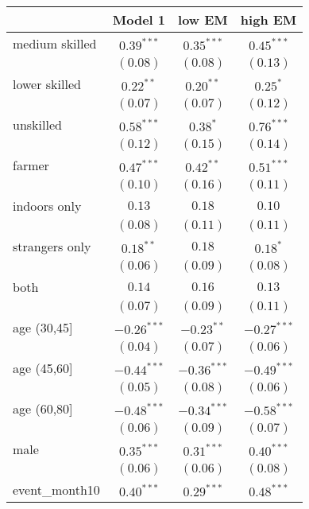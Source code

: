 
\begin{table}
\begin{center}
\begin{tabular}{l c c c}
\hline
 & Model 1 & low EM & high EM \\
\hline
medium skilled & $0.39^{***}$  & $0.35^{***}$  & $0.45^{***}$  \\
               & $(0.08)$      & $(0.08)$      & $(0.13)$      \\
lower skilled  & $0.22^{**}$   & $0.20^{**}$   & $0.25^{*}$    \\
               & $(0.07)$      & $(0.07)$      & $(0.12)$      \\
unskilled      & $0.58^{***}$  & $0.38^{*}$    & $0.76^{***}$  \\
               & $(0.12)$      & $(0.15)$      & $(0.14)$      \\
farmer         & $0.47^{***}$  & $0.42^{**}$   & $0.51^{***}$  \\
               & $(0.10)$      & $(0.16)$      & $(0.11)$      \\
indoors only   & $0.13$        & $0.18$        & $0.10$        \\
               & $(0.08)$      & $(0.11)$      & $(0.11)$      \\
strangers only & $0.18^{**}$   & $0.18$        & $0.18^{*}$    \\
               & $(0.06)$      & $(0.09)$      & $(0.08)$      \\
both           & $0.14$        & $0.16$        & $0.13$        \\
               & $(0.07)$      & $(0.09)$      & $(0.11)$      \\
age (30,45]    & $-0.26^{***}$ & $-0.23^{**}$  & $-0.27^{***}$ \\
               & $(0.04)$      & $(0.07)$      & $(0.06)$      \\
age (45,60]    & $-0.44^{***}$ & $-0.36^{***}$ & $-0.49^{***}$ \\
               & $(0.05)$      & $(0.08)$      & $(0.06)$      \\
age (60,80]    & $-0.48^{***}$ & $-0.34^{***}$ & $-0.58^{***}$ \\
               & $(0.06)$      & $(0.09)$      & $(0.07)$      \\
male           & $0.35^{***}$  & $0.31^{***}$  & $0.40^{***}$  \\
               & $(0.06)$      & $(0.06)$      & $(0.08)$      \\
event\_month10 & $0.40^{***}$  & $0.29^{***}$  & $0.48^{***}$  \\

\end{tabular}
\end{center}
\end{table}
